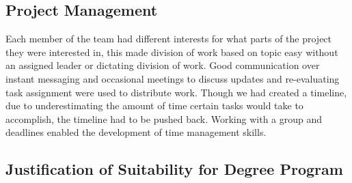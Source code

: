 \subsection{Project Management}
Each member of the team had different interests for what parts of the project they were interested in, this made division of work
based on topic easy without an assigned leader or dictating division of work.
Good communication over instant messaging and occasional meetings to discuss updates and re-evaluating task assignment were used to distribute work.
Though we had created a timeline, due to underestimating the amount of time certain tasks would take to accomplish, the timeline had to be pushed back.
Working with a group and deadlines enabled the development of time management skills.
\subsection{Justification of Suitability for Degree Program}

